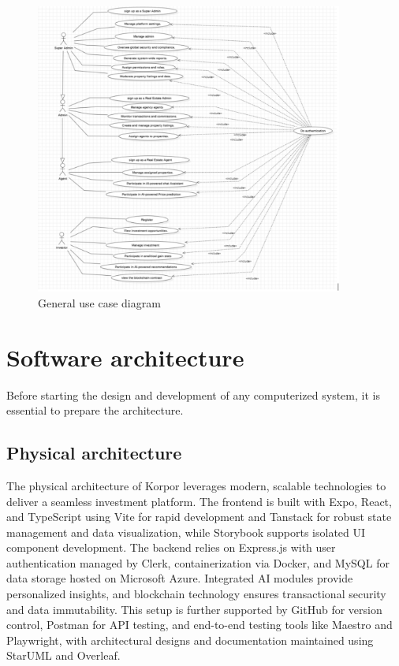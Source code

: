 \begin{figure}[htbp]
    \centering
    \includegraphics[width=0.9\textwidth]{images/diagram de case d utilisation general.png}
    \vspace{2cm}
    \caption{General use case diagram}
    \label{fig:use-case-diagram}
\end{figure}
\newpage
\section{Software architecture}

Before starting the design and development of any computerized system, it is essential to prepare the architecture.

\subsection{Physical architecture}

 The physical architecture of Korpor leverages modern, scalable technologies to deliver a seamless investment platform. The frontend is built with Expo, React, and TypeScript using Vite for rapid development and Tanstack for robust state management and data visualization, while Storybook supports isolated UI component development. The backend relies on Express.js with user authentication managed by Clerk, containerization via Docker, and MySQL for data storage hosted on Microsoft Azure. Integrated AI modules provide personalized insights, and blockchain technology ensures transactional security and data immutability. This setup is further supported by GitHub for version control, Postman for API testing, and end-to-end testing tools like Maestro and Playwright, with architectural designs and documentation maintained using StarUML and Overleaf.

